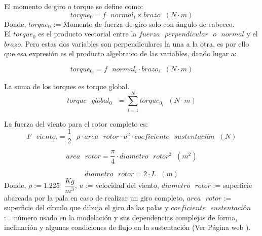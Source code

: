 El momento de giro o torque se define como:
  \begin{equation}
  torque_0 = f \text{ } normal_i \times brazo \hspace{7pt} (N \cdot m)
  \label{def:torque_inicial}
 \end{equation}
 Donde, $torque_0$ := Momento de fuerza de giro solo con ángulo de cabeceo.\\


El $torque_0$ es el producto vectorial entre la $fuerza  \text{ }perpendicular \text{ } o \text{ } normal$ y el $brazo$. Pero estas dos variables son perpendiculares la una a la otra, es por ello que esa expresión es el producto algebraico de las variables, dando lugar a:
 
 
  \begin{equation}
  torque_{0_i} = f \text{ } normal_i \cdot brazo_i \hspace{7pt} (N \cdot m)
 \label{def:torque_algebraico_inicial}
 \end{equation}
 
 La suma de los torques es torque global.
 \begin{equation}
  torque \text{ } global_0 \text{ } = \sum_{i=1}^{N} torque_0_{i} \hspace{7pt} (N \cdot m)
\label{def:torque_global}
\end{equation}
 
 
La fuerza del viento para el rotor completo es:
 \begin{equation}
  F \text{ } viento_i = \dfrac{1}{2} \text{ } \rho \cdot area \text{ } rotor \cdot u^2 \cdot coeficiente \text{ } sustentación \hspace{7pt} (N)
   \end{equation}
   
  \begin{equation}
  area \text{ } rotor = \dfrac{\pi}{4} \cdot diametro \text{ } rotor^2 \hspace{7pt} (m^2) 
  \end{equation}
  
  \begin{equation}
  diametro \text{ } rotor = 2 \cdot L \hspace{7pt} (m)
 \end{equation}
 Donde, $\rho := 1.225 \text{ } \dfrac{Kg}{m^3}$, $u$ := velocidad del viento, $diametro \text{ } rotor $ := superficie abarcada por la pala en caso de realizar un giro completo, $area \text{ } rotor$ := superficie del círculo que dibuja el giro de las palas y $coeficiente \text{ } sustentación$ := número usado en la modelación y sus dependencias complejas de forma, inclinación y algunas condiciones de flujo en la sustentación (Ver Página web \cite{Hall2021}).
 
